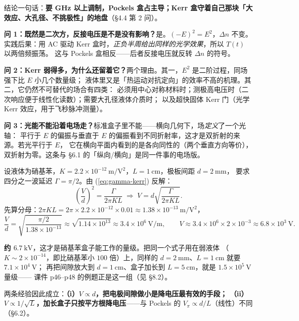 \documentclass[11pt]{ctexart}
\let\subhdrtheme\subhdr
\renewcommand{\subhdr}[1]{\needspace{3\baselineskip}\subhdrtheme{#1}}
\begin{document}
结论一句话：\textbf{要 GHz 以上调制，Pockels 盒占主导；Kerr 盒守着自己那块「大效应、大孔径、不挑极性」的地盘}（§4.4 第 2 问）。


\textbf{问 1：既然是二次方，反接电压是不是没有影响？}是。$(-E)^2=E^2$，$\Delta n$ 不变。
实践后果：用 AC 驱动 Kerr 盒时，\emph{正负半周给出同样的光学效果}，所以 $T(t)$ 以两倍频振荡。
这与 Pockels 盒相反——后者反接电压就反转 $\Delta n$ 的符号。

\textbf{问 2：Kerr 弱得多，为什么还留着它？}两个理由。其一，$E^2$ 是二阶过程，同场强下比 $E$ 小几个数量级；
液体里又是「热运动对抗定向」的效率不高的机理。其二，它仍然不可替代的场合有四类：
必须用中心对称材料时；测极高电压时（二次响应便于线性化读数）；需要大孔径液体介质时；
以及超快固体 Kerr 门（光学 Kerr 效应，用于飞秒脉冲测量）。

\textbf{问 3：光能不能沿着电场走？}标准盒子里不能——横向几何下，场\emph{定义}了一个光轴：
平行于 $E$ 的偏振与垂直于 $E$ 的偏振看到不同折射率，这才是双折射的来源。若光平行于 $E$，
它在横向平面内看到的是各向同性的（两个垂直方向等价），双折射为零。这条与 §6.1 的「纵向/横向」是同一件事的电场版。


设液体为硝基苯，$K=2.2\times10^{-12}\ \mathrm{m/V^2}$，$L=1\ \mathrm{cm}$，极板间距 $d=2\ \mathrm{mm}$，
要求四分之一波延迟 $\Gamma=\pi/2$。由 (\ref{eq:gamma-kerr}) 反解：
\begin{equation}
\left(\frac{V}{d}\right)^2=\frac{\Gamma}{2\pi KL}
\;\Longrightarrow\;
V=d\sqrt{\frac{\Gamma}{2\pi K L}} .
\end{equation}
先算分母：$2\pi KL=2\pi\times2.2\times10^{-12}\times0.01\approx1.38\times10^{-13}\ \mathrm{m/V^2}$，
\begin{equation}
\frac{V}{d}=\sqrt{\frac{\pi/2}{1.38\times10^{-13}}}\approx\sqrt{1.14\times10^{13}}
\approx3.4\times10^{6}\ \mathrm{V/m},
\qquad
V\approx3.4\times10^{6}\times2\times10^{-3}\approx6.8\times10^{3}\ \mathrm{V}.
\end{equation}

\textbf{约 $6.7\ \mathrm{kV}$}，这才是硝基苯盒子能工作的量级。把同一个式子用在弱液体
（$K\sim2\times10^{-14}$，即比硝基苯小 $100$ 倍）上，同样的 $d=2\ \mathrm{mm}$、$L=1\ \mathrm{cm}$ 就要 $7.1\times10^{4}\ \mathrm{V}$；
再把间隙放大到 $d=1\ \mathrm{cm}$、盒子加长到 $L=5\ \mathrm{cm}$，就是 $1.5\times10^{5}\ \mathrm{V}$ 量级——
课件 p46--p48 的例题正是这一组（见 §8.2）。

两条经验因此成立：\textbf{（i）$V\propto d$，把电极间隙做小是降电压最有效的手段；
（ii）$V\propto1/\sqrt{L}$，加长盒子只按平方根降电压}——与 Pockels 的 $V_\pi\propto d/L$（线性）不同（§6.2）。
\end{document}
